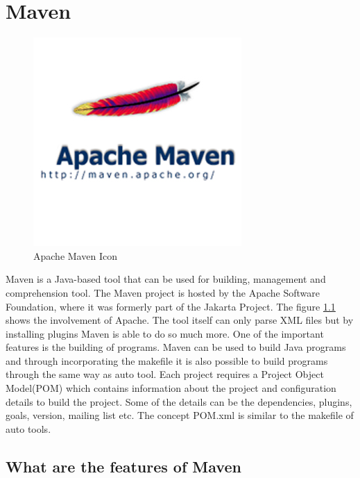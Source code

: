 \chapter{Maven}
\begin{figure}
 \vspace{-20pt}
  \begin{centering}
  \includegraphics[scale=0.5]{apache-maven.jpg}
  \end{centering}
  \vspace{-40pt}
  \caption{Apache Maven Icon\protect\footnotemark}
  \label{fig:maven1}
\end{figure}

Maven is a Java-based tool that can be used for building, management and comprehension tool. The Maven project is hosted by the Apache Software Foundation, where it was formerly part of the Jakarta Project. The figure \ref{fig:maven1} shows the involvement of Apache. The tool itself can only parse XML files but by installing plugins Maven is able to do so much more. One of the important features is the building of programs. Maven can be used to build Java programs and through incorporating the makefile it is also possible to build programs through the same way as auto tool. Each project requires a Project Object Model(POM) which contains information about the project and configuration details to build the project. Some of the details can be the dependencies, plugins, goals, version, mailing list etc. The concept POM.xml is similar to the makefile of auto tools.

\section{What are the features of Maven}

